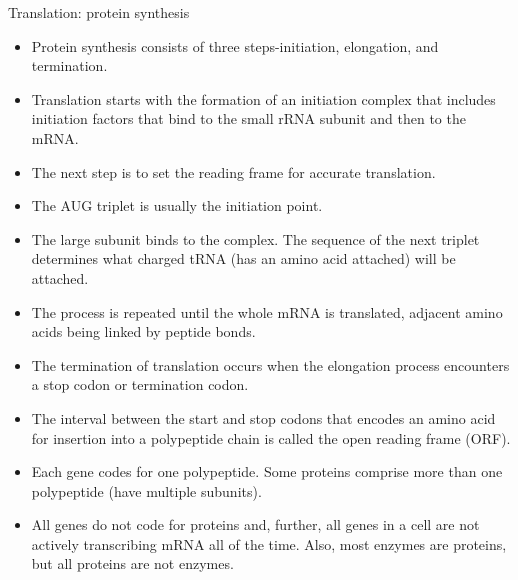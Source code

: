 \documentclass[11pt,ignorenonframetext,aspectratio=169]{beamer}
\providecommand{\tightlist}{%
  \setlength{\itemsep}{0pt}\setlength{\parskip}{0pt}}
\begin{document}
\begin{frame}{Translation: protein synthesis}
\protect\hypertarget{translation-protein-synthesis}{}

\begin{itemize}
\tightlist
\item
  Protein synthesis consists of three steps-initiation, elongation, and
  termination.
\item
  Translation starts with the formation of an initiation complex that
  includes initiation factors that bind to the small rRNA subunit and
  then to the mRNA.
\item
  The next step is to set the reading frame for accurate translation.
\item
  The AUG triplet is usually the initiation point.
\item
  The large subunit binds to the complex. The sequence of the next
  triplet determines what charged tRNA (has an amino acid attached) will
  be attached.
\item
  The process is repeated until the whole mRNA is translated, adjacent
  amino acids being linked by peptide bonds.
\end{itemize}

\end{frame}

\begin{frame}{}
\protect\hypertarget{section-21}{}

\begin{itemize}
\tightlist
\item
  The termination of translation occurs when the elongation process
  encounters a stop codon or termination codon.
\item
  The interval between the start and stop codons that encodes an amino
  acid for insertion into a polypeptide chain is called the open reading
  frame (ORF).
\item
  Each gene codes for one polypeptide. Some proteins comprise more than
  one polypeptide (have multiple subunits).
\item
  All genes do not code for proteins and, further, all genes in a cell
  are not actively transcribing mRNA all of the time. Also, most enzymes
  are proteins, but all proteins are not enzymes.
\end{itemize}

\end{frame}
\end{document}
